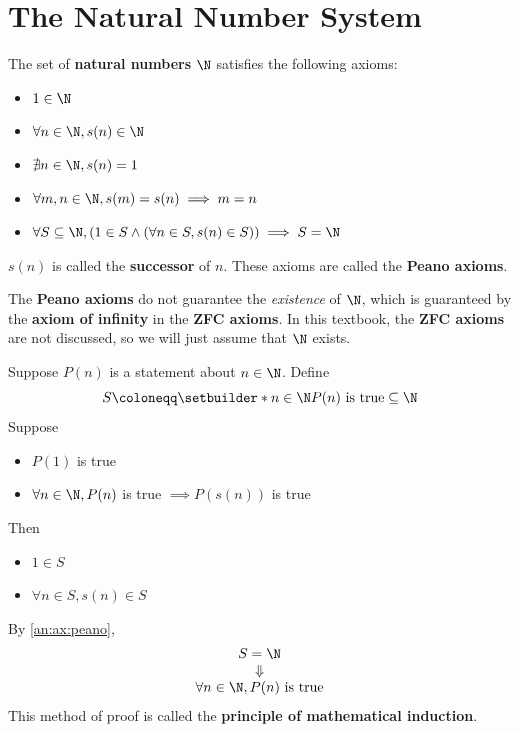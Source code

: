 \section{The Natural Number System}

\begin{axiom} \label{an:ax:peano}
  The set of \textbf{natural numbers} $\N$ satisfies the following axioms:
  \begin{itemize}
    \item $1 \in \N$
    \item $\forall n \in \N, s(n) \in \N$
    \item $\nexists n \in \N, s(n) = 1$
    \item $\forall m, n \in \N, s(m) = s(n) \implies m = n$
    \item $\forall S \subseteq \N, (1 \in S \land (\forall n \in S, s(n) \in S)) \implies S = \N$
  \end{itemize}
  $s(n)$ is called the \textbf{successor} of $n$. These axioms are called the \textbf{Peano axioms}.
\end{axiom}

\bigskip

\begin{remark}
  The \textbf{Peano axioms} do not guarantee the \emph{existence} of $\N$, which is guaranteed by the
  \textbf{axiom of infinity} in the \textbf{ZFC axioms}. In this textbook, the \textbf{ZFC axioms}
  are not discussed, so we will just assume that $\N$ exists.
\end{remark}

\bigskip

\begin{theorem} \label{an:thm:mathematical-induction}
  Suppose $P(n)$ is a statement about $n \in \N$. Define
  \[
    S \coloneqq \setbuilder*{n \in \N}{P(n) \text{ is true}} \subseteq \N
  \]
  Suppose
  \begin{itemize}
    \item $P(1)$ is true
    \item $\forall n \in \N, P(n)$ is true $\implies P(s(n))$ is true
  \end{itemize}
  Then
  \begin{itemize}
    \item $1 \in S$
    \item $\forall n \in S, s(n) \in S$
  \end{itemize}
  By \cref{an:ax:peano},
  \[
    \begin{array}{c}
      S = \N     \\
      \Downarrow \\
      \forall n \in \N, P(n) \text{ is true}
    \end{array}
  \]
  This method of proof is called the \textbf{principle of mathematical induction}.
\end{theorem}

